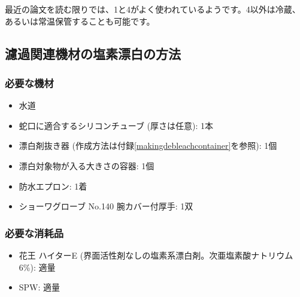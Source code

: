 \documentclass[titlepage,10pt,a4paper]{jsbook}
\begin{document}
最近の論文を読む限りでは、1と4がよく使われているようです。4以外は冷蔵、あるいは常温保管することも可能です。

\subsection{濾過関連機材の塩素漂白の方法}

\subsubsection{必要な機材}
\begin{itemize}
\item 水道
\item 蛇口に適合するシリコンチューブ (厚さは任意): 1本
\item 漂白剤抜き器 (作成方法は付録\ref{makingdebleachcontainer}を参照): 1個
\item 漂白対象物が入る大きさの容器: 1個
\item 防水エプロン: 1着
\item ショーワグローブ No.140 腕カバー付厚手: 1双
\end{itemize}

\subsubsection{必要な消耗品}
\begin{itemize}
\item 花王 ハイターE (界面活性剤なしの塩素系漂白剤。次亜塩素酸ナトリウム6\%): 適量
\item SPW: 適量
\end{itemize}
\end{document}
